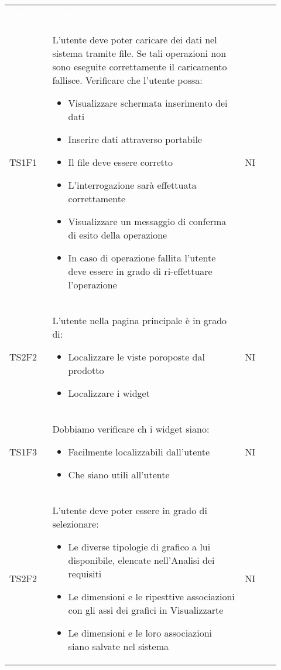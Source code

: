 \renewcommand{\arraystretch}{1.5}
\begin{longtable}{p{0.12\linewidth}p{0.68\linewidth}p{0.12\linewidth}}
	\rowcolor[RGB]{33, 73, 50}
	\textcolor{white}{\textbf{Codice}} & \textcolor{white}{\textbf{Descrizione}} & \textcolor{white}{\textbf{Stato}}\\
    \rowcolor[RGB]{233, 245, 206}
    TS1F1 &
    L'utente deve poter caricare dei dati nel sistema tramite file. 
    Se tali operazioni non sono eseguite
    correttamente il caricamento fallisce. Verificare che l'utente possa:
    \begin{itemize}
        \item Visualizzare schermata inserimento dei dati
        \item Inserire dati attraverso portabile
        \item Il file deve essere corretto
        \item L'interrogazione sarà effettuata correttamente
        \item Visualizzare un messaggio di conferma di esito della operazione
        \item In caso di operazione fallita l'utente deve essere in grado di ri-effettuare l'operazione
    \end{itemize}
    & NI\\ 
    \rowcolor[RGB]{216, 235, 171}
    TS2F2 &
    L'utente nella pagina principale è in grado di:
    \begin{itemize}
        \item Localizzare le viste poroposte dal prodotto
        \item Localizzare i widget 
    \end{itemize}
    & NI\\
    \rowcolor[RGB]{233, 245, 206}
    TS1F3 &
    Dobbiamo verificare ch i widget siano:
    \begin{itemize}
        \item Facilmente localizzabili dall'utente
        \item Che siano utili all'utente
    \end{itemize}
    & NI\\
    \rowcolor[RGB]{216, 235, 171}
    TS2F2 &
    L'utente deve poter essere in grado di selezionare:
    \begin{itemize}
        \item Le diverse tipologie di grafico a lui disponibile, elencate nell'Analisi dei requisiti
        \item Le dimensioni e le ripesttive associazioni con gli assi dei grafici in Visualizzarte
        \item Le dimensioni e le loro associazioni siano salvate nel sistema
    \end{itemize}
    & NI\\
\end{longtable}	
\newpage
